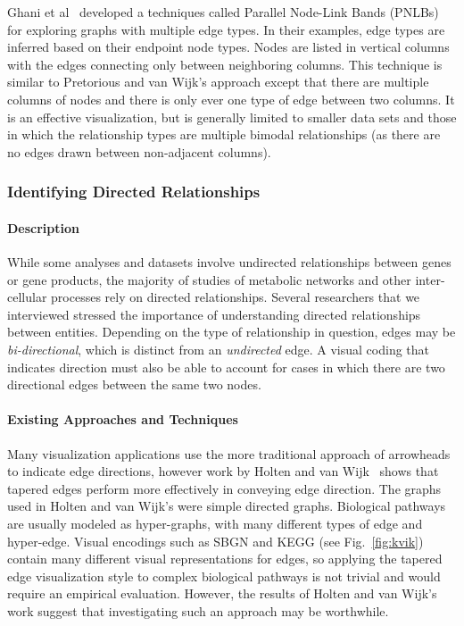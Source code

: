 \documentclass[twocolumn]{bmcart}%
\begin{document}
Ghani et al~\cite{Ghani2013} developed a techniques called Parallel Node-Link Bands (PNLBs) for exploring graphs with multiple edge types.
In their examples, edge types are inferred based on their endpoint node types.
Nodes are listed in vertical columns with the edges connecting only between neighboring columns.
This technique is similar to Pretorious and van Wijk's approach except that there are multiple columns of nodes and there is only ever one type of edge between two columns.
It is an effective visualization, but is generally limited to smaller data sets and those in which the relationship types are multiple bimodal relationships (as there are no edges drawn between non-adjacent columns).

\subsubsection*{Identifying Directed Relationships}

\paragraph*{Description}

While some analyses and datasets involve undirected relationships between genes or gene products, the majority of studies of metabolic networks and other inter-cellular processes rely on directed relationships.
Several researchers that we interviewed stressed the importance of understanding directed relationships between entities.
Depending on the type of relationship in question, edges may be \textit{bi-directional}, which is distinct from an \textit{undirected} edge.
A visual coding that indicates direction must also be able to account for cases in which there are two directional edges between the same two nodes.


\paragraph*{Existing Approaches and Techniques}

Many visualization applications use the more traditional approach of arrowheads to indicate edge directions, however work by Holten and van Wijk~\cite{Holten2009} shows that tapered edges perform more effectively in conveying edge direction.
The graphs used in Holten and van Wijk's were simple directed graphs.
Biological pathways are usually modeled as hyper-graphs, with many different types of edge and hyper-edge.
Visual encodings such as SBGN and KEGG (see Fig.~\ref{fig:kvik}) contain many different visual representations for edges, so applying the tapered edge visualization style to complex biological pathways is not trivial and would require an empirical evaluation.
However, the results of Holten and van Wijk's work suggest that investigating such an approach may be worthwhile.
\end{document}
